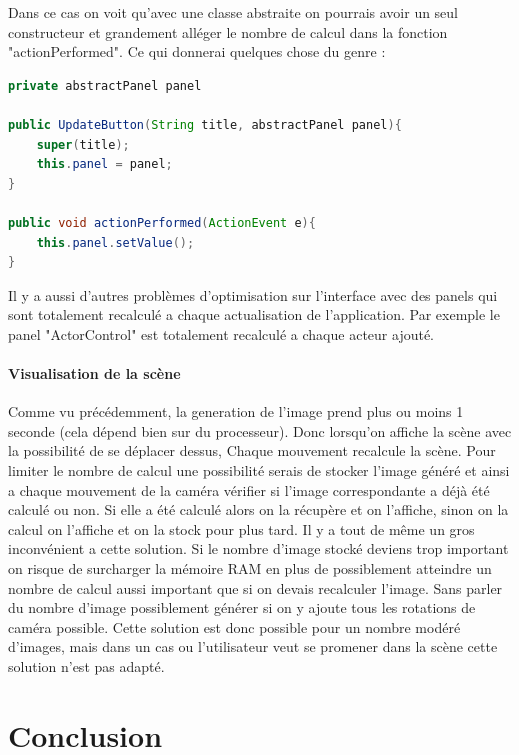 \documentclass[12pt]{article}
\begin{document}
				
			
				Dans ce cas on voit qu'avec une classe abstraite on pourrais avoir un seul constructeur et grandement alléger le nombre de calcul dans la fonction "actionPerformed". Ce qui donnerai quelques chose du genre :
			
				\begin{lstlisting}[language=Java, title="Idée de factorisation"]
private abstractPanel panel
			
public UpdateButton(String title, abstractPanel panel){
	super(title);
	this.panel = panel;
}
			
public void actionPerformed(ActionEvent e){
	this.panel.setValue();
}
			\end{lstlisting}
		
			Il y a aussi d'autres problèmes d'optimisation sur l'interface avec des panels qui sont totalement recalculé a chaque actualisation de l'application. Par exemple le panel "ActorControl" est totalement recalculé a chaque acteur ajouté.
		
			\paragraph{Visualisation de la scène}
			Comme vu précédemment, la generation de l'image prend plus ou moins 1 seconde (cela dépend bien sur du processeur). Donc lorsqu'on affiche la scène avec la possibilité de se déplacer dessus, Chaque mouvement recalcule la scène. Pour limiter le nombre de calcul une possibilité serais de stocker l'image généré et ainsi a chaque mouvement de la caméra vérifier si l'image correspondante a déjà été calculé ou non. Si elle a été calculé alors on la récupère et on l'affiche, sinon on la calcul on l'affiche et on la stock pour plus tard.
			Il y a tout de même un gros inconvénient a cette solution. Si le nombre d'image stocké deviens trop important on risque de surcharger la mémoire RAM en plus de possiblement atteindre un nombre de calcul aussi important que si on devais recalculer l'image. Sans parler du nombre d'image possiblement générer si on y ajoute tous les rotations de caméra possible.
			Cette solution est donc possible pour un nombre modéré d'images, mais dans un cas ou l'utilisateur veut se promener dans la scène cette solution n'est pas adapté.
		
		\newpage
		\section{Conclusion}
	
\end{document}
